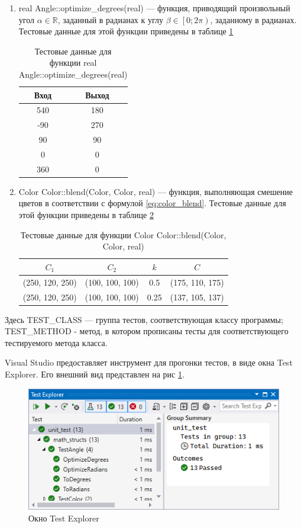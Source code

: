 \begin{enumerate}
	\item real Angle::optimize\_degrees(real) --- функция, приводящий произвольный угол $\alpha\in\mathbb{R}$, заданный в радианах к углу $\beta\in\left[0; 2\pi\right)$, заданному в радианах. Тестовые данные для этой функции приведены в таблице \ref{tbl:optimize_degrees}
	\begin{table}
		\centering
		\caption{Тестовые данные для функции real Angle::optimize\_degrees(real)}
		\label{tbl:optimize_degrees}
		\begin{tabular}{|c|c|}
			\hline
			Вход & Выход \\
			\hline
			540 & 180 \\
			-90 & 270 \\
			90 & 90 \\
			0 & 0 \\
			360 & 0 \\
			\hline
		\end{tabular}
	\end{table}

	\item Color Color::blend(Color, Color, real) --- функция, выполняющая смешение цветов в соответствии с формулой \ref{eq:color_blend}. Тестовые данные для этой функции приведены в таблице \ref{tbl:color_blend}
	\begin{table}
		\centering
		\caption{Тестовые данные для функции Color Color::blend(Color, Color, real)}
		\label{tbl:color_blend}
		\begin{tabular}{|c|c|c|c|}
			\hline
			$C_1$ & $C_2$ & $k$ & $C$ \\
			\hline
			(250, 120, 250) & (100, 100, 100) & 0.5 & (175, 110, 175) \\
			(250, 120, 250) & (100, 100, 100) & 0.25 & (137, 105, 137) \\
			\hline
		\end{tabular}
	\end{table}
\end{enumerate}

Здесь TEST\_CLASS --- группа тестов, соответствующая классу программы; TEST\_METHOD - метод, в котором прописаны тесты для соответствующего тестируемого метода класса.

Visual Studio предоставляет инструмент для прогонки тестов, в виде окна Test Explorer. Его внешний вид представлен на рис \ref{fig:test_explorer}.

\begin{figure}[ht]
	\centering
	\includegraphics[width=1\linewidth]{img/test_explorer}
	\caption{Окно Test Explorer}
	\label{fig:test_explorer}
\end{figure}


